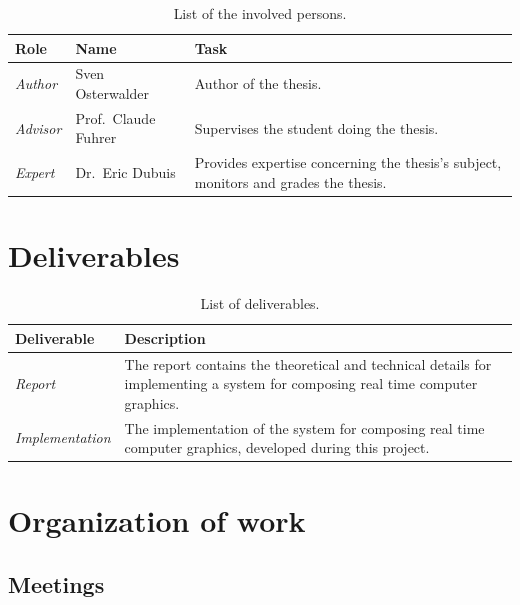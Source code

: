 \documentclass[%
    a4paper,    %
    justified,  %
    nobib,      %
    openany     %
]{tufte-book}
\makeatletter
\renewcommand{\label}[1]{\@tufte@label{##1}}%
\makeatother
\begin{document}
\begin{table}[h]
  \caption{List of the involved persons.}
  \begin{tabularx}{\textwidth}{llX}
    \toprule
    \textbf{Role} & \textbf{Name} & \textbf{Task} \\
    \midrule
    \textit{Author}  & Sven Osterwalder\protect\footnotemark[1]{} & Author of the thesis.\\
    \textit{Advisor} & Prof.\ Claude Fuhrer\protect\footnotemark[2]{} & Supervises the student doing the thesis.\\
    \textit{Expert}  & Dr.\ Eric Dubuis\protect\footnotemark[3]{}     & Provides expertise concerning the thesis's subject, monitors and grades the thesis.\\
    \bottomrule
  \end{tabularx}
\end{table}

\newpage{}

\section{Deliverables}
\label{sec:deliverables}

\begin{table}[h]
  \caption{List of deliverables.}
  \begin{tabularx}{\textwidth}{lX}
    \toprule
    \textbf{Deliverable} & \textbf{Description} \\
    \midrule
    \textit{Report} & The report contains the theoretical and technical details for
    implementing a system for composing real time computer graphics. \\
    \midrule
    \textit{Implementation} & The implementation of the system for composing real time
    computer graphics, developed during this project. \\
    \bottomrule
  \end{tabularx}
\end{table}

\section{Organization of work}
\label{sec:organization-of-work}

\subsection{Meetings}
\label{subsec:meetings}
\end{document}
